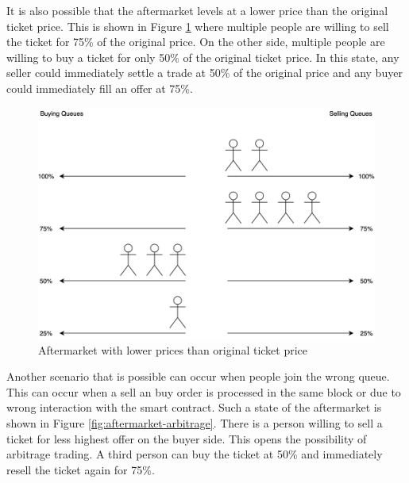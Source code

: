 It is also possible that the aftermarket levels at a lower price than the original ticket price. This is shown in Figure \ref{fig:aftermarket-mixed} where multiple people are willing to sell the ticket for 75\% of the original price. On the other side, multiple people are willing to buy a ticket for only 50\% of the original ticket price. In this state, any seller could immediately settle a trade at 50\% of the original price and any buyer could immediately fill an offer at 75\%. 

\begin{figure}[H]
    \centering
    \includegraphics[width=16cm]{figures/aftermarket-mixed.png}
    \caption{Aftermarket with lower prices than original ticket price}
    \label{fig:aftermarket-mixed}
\end{figure}

Another scenario that is possible can occur when people join the wrong queue. This can occur when a sell an buy order is processed in the same block or due to wrong interaction with the smart contract. Such a state of the aftermarket is shown in Figure \ref{fig:aftermarket-arbitrage}. There is a person willing to sell a ticket for less highest offer on the buyer side. This opens the possibility of arbitrage trading. A third person can buy the ticket at 50\% and immediately resell the ticket again for 75\%. 

